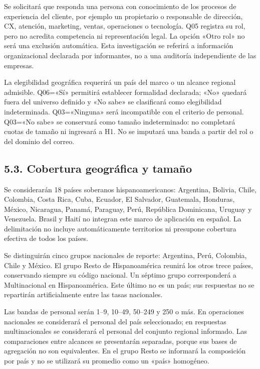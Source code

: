 \documentclass[12pt,letterpaper]{article}
\begin{document}
Se solicitará que responda una persona con conocimiento de los procesos de experiencia del cliente, por ejemplo un propietario o responsable de dirección, CX, atención, marketing, ventas, operaciones o tecnología. Q05 registra su rol, pero no acredita competencia ni representación legal. La opción «Otro rol» no será una exclusión automática. Esta investigación se referirá a información organizacional declarada por informantes, no a una auditoría independiente de las empresas.

La elegibilidad geográfica requerirá un país del marco o un alcance regional admisible. Q06=«Sí» permitirá establecer formalidad declarada; «No» quedará fuera del universo definido y «No sabe» se clasificará como elegibilidad indeterminada. Q03=«Ninguna» será incompatible con el criterio de personal. Q03=«No sabe» se conservará como tamaño indeterminado: no completará cuotas de tamaño ni ingresará a H1. No se imputará una banda a partir del rol o del dominio del correo.

\subsection*{5.3. Cobertura geográfica y tamaño}
Se considerarán 18 países soberanos hispanoamericanos: Argentina, Bolivia, Chile, Colombia, Costa Rica, Cuba, Ecuador, El Salvador, Guatemala, Honduras, México, Nicaragua, Panamá, Paraguay, Perú, República Dominicana, Uruguay y Venezuela. Brasil y Haití no integran este marco de aplicación en español. La delimitación no incluye automáticamente territorios ni presupone cobertura efectiva de todos los países.

Se distinguirán cinco grupos nacionales de reporte: Argentina, Perú, Colombia, Chile y México. El grupo Resto de Hispanoamérica reunirá los otros trece países, conservando siempre su código nacional. Un séptimo grupo corresponderá a Multinacional en Hispanoamérica. Este último no es un país; sus respuestas no se repartirán artificialmente entre las tasas nacionales.

Las bandas de personal serán 1--9, 10--49, 50--249 y 250 o más. En operaciones nacionales se considerará el personal del país seleccionado; en respuestas multinacionales se considerará el personal del conjunto regional informado. Las comparaciones entre alcances se presentarán separadas, porque sus bases de agregación no son equivalentes. En el grupo Resto se informará la composición por país y no se utilizará su promedio como un «país» homogéneo.
\end{document}
